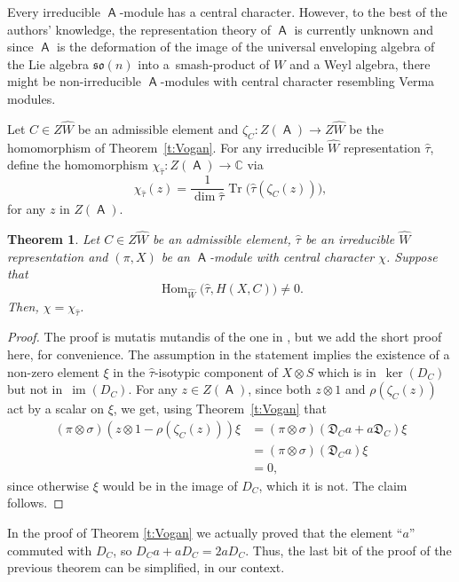 \documentclass[pdftex]{sigma}
\numberwithin{equation}{section}
\newtheorem{Theorem}{Theorem}[section]
\DeclareMathOperator{\im}{im}
\DeclareMathOperator{\Hom}{Hom}
\DeclareMathOperator{\Tr}{Tr}
\newcommand{\fo}{\mathfrak{o}}
\newcommand{\fs}{\mathfrak{s}}
\newcommand{\bbc}{\mathbb{C}}
\DeclareMathOperator{\ama}{\mathsf{A}}
\begin{document}
\begin{Remark}
Every irreducible $\ama$-module has a central character. However, to the best of the authors' knowledge, the representation theory of $\ama$ is currently unknown and since $\ama$ is the deformation of the image of the universal enveloping algebra of the Lie algebra $\fs\fo(n)$ into a~smash-product of $W$ and a Weyl algebra, there might be non-irreducible $\ama$-modules with central character resembling Verma modules.
\end{Remark}

\begin{Definition}
Let $C\in Z\hat{W}$ be an admissible element and $\zeta_C\colon Z(\ama)\to Z\hat{W}$ be the homomorphism of Theorem~\ref{t:Vogan}. For any irreducible $\hat{W}$ representation $\hat{\tau}$, define the homomorphism $\chi_{\hat{\tau}}\colon Z(\ama)\to\bbc$ via
\[
\chi_{\hat{\tau}}(z) = \frac{1}{\dim\hat{\tau}}\Tr\big( \hat{\tau}(\zeta_C(z)) \big),
\]
for any $z$ in $Z(\ama)$.
\end{Definition}

\begin{Theorem}\label{t:CentChar}
Let $C\in Z\hat{W}$ be an admissible element, $\hat\tau$ be an irreducible $\hat{W}$ representation and $(\pi,X)$ be an $\ama$-module with central character $\chi$. Suppose that
\[
\Hom_{\hat{W}}\big(\hat{\tau},H(X,C)\big)\neq 0.
\]
Then, $\chi = \chi_{\hat{\tau}}$.
\end{Theorem}

\begin{proof}
The proof is mutatis mutandis of the one in \cite[Theorem~4.5]{BCT12}, but we add the short proof here, for convenience. The assumption in the statement implies the existence of a non-zero element $\xi$ in the $\hat{\tau}$-isotypic component of $X\otimes S$ which is in~$\ker(D_C)$ but not in~$\im(D_C)$. For any $z\in Z(\ama)$, since both $z\otimes 1$ and $\rho(\zeta_C(z))$ act by a scalar on $\xi$, we get, using Theorem~\ref{t:Vogan} that
\begin{align*}
 (\pi\otimes \sigma)(z\otimes 1 - \rho(\zeta_C(z)))\xi & = (\pi\otimes \sigma)(\mathfrak{D}_Ca + a\mathfrak{D}_C)\xi\\
 &= (\pi\otimes \sigma)(\mathfrak{D}_Ca)\xi\\
 &= 0,
\end{align*}
since otherwise $\xi$ would be in the image of $D_C$, which it is not. The claim follows.
\end{proof}

\begin{Remark}
In the proof of Theorem \ref{t:Vogan} we actually proved that the element ``$a$'' commuted with $D_C$, so $D_Ca + aD_C = 2aD_C$. Thus, the last bit of the proof of the previous theorem can be simplified, in our context.
\end{Remark}
\end{document}
